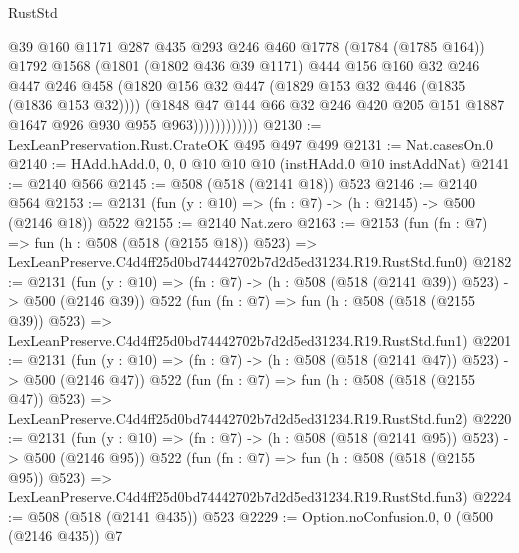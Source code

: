 \begin{lexlean}{RustStd}
\begin{coremodule}
                        @39
                        @160
                        @1171
                        @287
                        @435
                        @293
                        @246
                        @460
                        @1778
                        (@1784 (@1785 @164))
                        @1792
                        @1568
                        (@1801
                          (@1802 @436 @39 @1171)
                          @444
                          @156
                          @160
                          @32
                          @246
                          @447
                          @246
                          @458
                          (@1820 @156 @32 @447 (@1829 @153 @32 @446 (@1835 (@1836 @153 @32))))
                          (@1848
                            @47
                            @144
                            @66
                            @32
                            @246
                            @420
                            @205
                            @151
                            @1887
                            @1647
                            @926
                            @930
                            @955
                            @963))))))))))))
@2130 := LexLeanPreservation.Rust.CrateOK @495 @497 @499
@2131 := Nat.casesOn.{0}
@2140 := HAdd.hAdd.{0, 0, 0} @10 @10 @10 (instHAdd.{0} @10 instAddNat)
@2141 := @2140 @566
@2145 := @508 (@518 (@2141 @18)) @523
@2146 := @2140 @564
@2153 := @2131 (fun (y : @10) => (fn : @7) -> (h : @2145) -> @500 (@2146 @18)) @522
@2155 := @2140 Nat.zero
@2163 := @2153
    (fun (fn : @7) =>
    fun (h : @508 (@518 (@2155 @18)) @523) =>
    LexLeanPreserve.C4d4ff25d0bd74442702b7d2d5ed31234.R19.RustStd.fun0)
@2182 := @2131
    (fun (y : @10) => (fn : @7) -> (h : @508 (@518 (@2141 @39)) @523) -> @500 (@2146 @39))
    @522
    (fun (fn : @7) =>
    fun (h : @508 (@518 (@2155 @39)) @523) =>
    LexLeanPreserve.C4d4ff25d0bd74442702b7d2d5ed31234.R19.RustStd.fun1)
@2201 := @2131
    (fun (y : @10) => (fn : @7) -> (h : @508 (@518 (@2141 @47)) @523) -> @500 (@2146 @47))
    @522
    (fun (fn : @7) =>
    fun (h : @508 (@518 (@2155 @47)) @523) =>
    LexLeanPreserve.C4d4ff25d0bd74442702b7d2d5ed31234.R19.RustStd.fun2)
@2220 := @2131
    (fun (y : @10) => (fn : @7) -> (h : @508 (@518 (@2141 @95)) @523) -> @500 (@2146 @95))
    @522
    (fun (fn : @7) =>
    fun (h : @508 (@518 (@2155 @95)) @523) =>
    LexLeanPreserve.C4d4ff25d0bd74442702b7d2d5ed31234.R19.RustStd.fun3)
@2224 := @508 (@518 (@2141 @435)) @523
@2229 := Option.noConfusion.{0, 0} (@500 (@2146 @435)) @7

\end{coremodule}
\end{lexlean}
